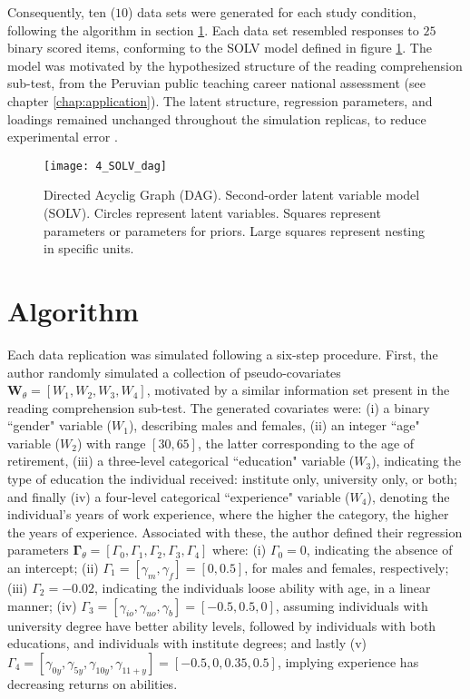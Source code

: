 Consequently, ten ($10$) data sets were generated for each study condition, following the algorithm in section \ref{sect:algorithm}. Each data set resembled responses to $25$ binary scored items, conforming to the SOLV model defined in figure \ref{fig:SOLV_model}. The model was motivated by the hypothesized structure of the reading comprehension sub-test, from the Peruvian public teaching career national assessment (see chapter \ref{chap:application}). The latent structure, regression parameters, and loadings remained unchanged throughout the simulation replicas, to reduce experimental error \cite{Kieftenbeld_et_al_2012}. 
%
\begin{figure}[h]
	\centering
	\texttt{[image: 4\_SOLV\_dag]}
	\caption[Directed Acyclic Graph (DAG). Second-order latent variable model (SOLV).]%
	{Directed Acyclig Graph (DAG). Second-order latent variable model (SOLV). Circles represent latent variables. Squares represent parameters or parameters for priors. Large squares represent nesting in specific units.}
	\label{fig:SOLV_model}
\end{figure}


\section{Algorithm} \label{sect:algorithm}

Each data replication was simulated following a six-step procedure. First, the author randomly simulated a collection of pseudo-covariates $\mathbf{W}_{\theta} = [ W_{1}, W_{2}, W_{3}, W_{4} ]$, motivated by a similar information set present in the reading comprehension sub-test. The generated covariates were: (i) a binary ``gender" variable ($W_{1}$), describing males and females, (ii) an integer ``age" variable ($W_{2}$) with range $[30, 65]$, the latter corresponding to the age of retirement, (iii) a three-level categorical ``education" variable ($W_{3}$), indicating the type of education the individual received: institute only, university only, or both; and finally (iv) a four-level categorical ``experience" variable ($W_{4}$), denoting the individual's years of work experience, where the higher the category, the higher the years of experience. Associated with these, the author defined their regression parameters $\mathbf{\Gamma}_{\theta} = [\Gamma_{0}, \Gamma_{1}, \Gamma_{2}, \Gamma_{3}, \Gamma_{4}]$ where: (i) $\Gamma_{0} = 0$, indicating the absence of an intercept; (ii) $\Gamma_{1} = [\gamma_{m}, \gamma_{f}] = [0, 0.5]$, for males and females, respectively; (iii) $\Gamma_{2} = -0.02$, indicating the individuals loose ability with age, in a linear manner; (iv) $\Gamma_{3} = [\gamma_{io}, \gamma_{uo}, \gamma_{b}] = [-0.5, 0.5, 0]$, assuming individuals with university degree have better ability levels, followed by individuals with both educations, and individuals with institute degrees; and lastly (v) $\Gamma_{4} = [\gamma_{0y}, \gamma_{5y}, \gamma_{10y}, \gamma_{11+y}] = [-0.5, 0, 0.35, 0.5]$, implying experience has decreasing returns on abilities.

